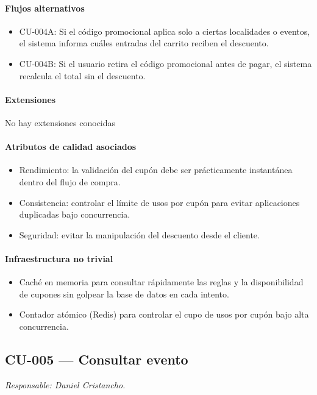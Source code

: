 \paragraph{Flujos alternativos}
\begin{itemize}[leftmargin=1.4em, topsep=1pt]
  \item CU-004A: Si el código promocional aplica solo a ciertas localidades o eventos, el sistema informa cuáles entradas del carrito reciben el descuento.
  \item CU-004B: Si el usuario retira el código promocional antes de pagar, el sistema recalcula el total sin el descuento.
\end{itemize}

\paragraph{Extensiones}
No hay extensiones conocidas

\paragraph{Atributos de calidad asociados}
\begin{itemize}[leftmargin=1.4em, topsep=1pt]
  \item Rendimiento: la validación del cupón debe ser prácticamente instantánea dentro del flujo de compra.
  \item Consistencia: controlar el límite de usos por cupón para evitar aplicaciones duplicadas bajo concurrencia.
  \item Seguridad: evitar la manipulación del descuento desde el cliente.
\end{itemize}

\paragraph{Infraestructura no trivial}
\begin{itemize}[leftmargin=1.4em, topsep=1pt]
  \item Caché en memoria para consultar rápidamente las reglas y la disponibilidad de cupones sin golpear la base de datos en cada intento.
  \item Contador atómico (Redis) para controlar el cupo de usos por cupón bajo alta concurrencia.
\end{itemize}

\subsection{CU-005 --- Consultar evento}
\label{cu:cu-005}
\textit{Responsable: Daniel Cristancho.}

